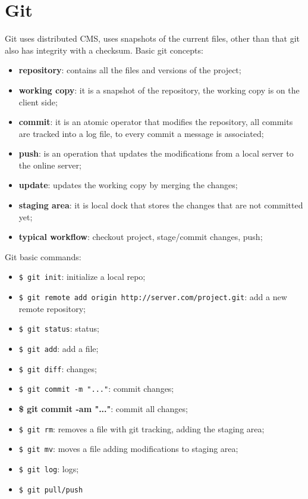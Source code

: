 \documentclass[12pt]{article}
\begin{document}
\section{Git}
Git uses distributed CMS, uses snapshots of the current files, other than that git also has integrity with a checksum. Basic git concepts:
\begin{itemize}
    \item \textbf{repository}: contains all the files and versions of the project;
    \item \textbf{working copy}: it is a snapshot of the repository, the working copy is on the client side;
    \item \textbf{commit}: it is an atomic operator that modifies the repository, all commits are tracked into a log file, to every commit a message is associated;
    \item \textbf{push}: is an operation that updates the modifications from a local server to the online server;
    \item \textbf{update}: updates the working copy by merging the changes;
    \item \textbf{staging area}: it is local dock that stores the changes that are not committed yet;
    \item \textbf{typical workflow}: checkout project, stage/commit changes, push;
\end{itemize}
Git basic commands: 
\begin{itemize}
    \item \texttt{\$ git init}: initialize a local repo;
    \item \texttt{\$ git remote add origin http://server.com/project.git}: add a new remote repository;
    \item \texttt{\$ git status}: status;
    \item \texttt{\$ git add}: add a file;
    \item \texttt{\$ git diff}: changes;
    \item \texttt{\$ git commit -m "..."}: commit changes;
    \item \textbf{\$ git commit -am "..."}: commit all changes;
    \item \texttt{\$ git rm}: removes a file with git tracking, adding the staging area;
    \item \texttt{\$ git mv}: moves a file adding modifications to staging area;
    \item \texttt{\$ git log}: logs;
    \item \texttt{\$ git pull/push}
\end{itemize}
\end{document}
